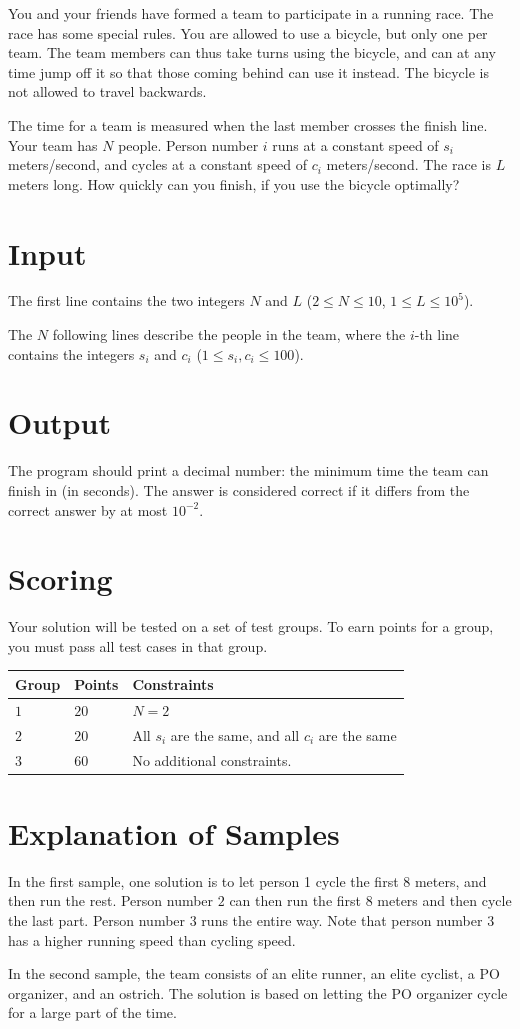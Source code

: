You and your friends have formed a team to participate in a running race. The race has some special rules.
You are allowed to use a bicycle, but only one per team. The team members can thus take turns using the bicycle, and can
at any time jump off it so that those coming behind can use it instead. The bicycle is not allowed to travel backwards.

The time for a team is measured when the last member crosses the finish line. Your team has $N$ people. Person number $i$ runs at a
constant speed of $s_i$ meters/second, and cycles at a constant speed of $c_i$ meters/second. The race is $L$ meters long.
How quickly can you finish, if you use the bicycle optimally?

\section*{Input}
The first line contains the two integers $N$ and $L$ ($2 \leq N \leq 10$, $1 \leq L \leq 10^5$).

The $N$ following lines describe the people in the team, where the $i$-th line contains the integers $s_i$ and $c_i$ ($1 \leq s_i, c_i \leq 100$).

\section*{Output}
The program should print a decimal number: the minimum time the team can finish in (in seconds).
The answer is considered correct if it differs from the correct answer by at most $10^{-2}$.

\section*{Scoring}
Your solution will be tested on a set of test groups.
To earn points for a group, you must pass all test cases in that group.

\noindent
\begin{tabular}{| l | l | l |}
  \hline
  \textbf{Group} & \textbf{Points} & \textbf{Constraints} \\ \hline
  $1$    & $20$        &  $N = 2$ \\ \hline
  $2$    & $20$        &  All $s_i$ are the same, and all $c_i$ are the same \\ \hline
  $3$    & $60$        &  No additional constraints. \\ \hline
\end{tabular}

\section*{Explanation of Samples}
In the first sample, one solution is to let person 1 cycle the first $8$ meters, and then run the rest. Person number $2$
can then run the first $8$ meters and then cycle the last part. Person number $3$ runs the entire way. Note that person number $3$ has
a higher running speed than cycling speed.

In the second sample, the team consists of an elite runner, an elite cyclist, a PO organizer, and an ostrich. The solution is based on letting the PO organizer
cycle for a large part of the time.
